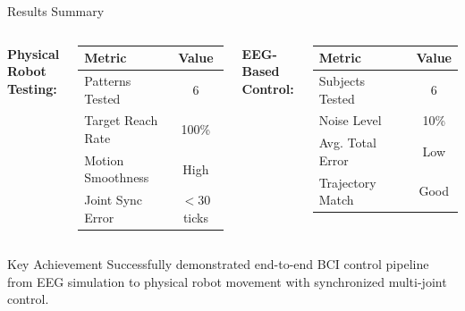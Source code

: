 \documentclass[aspectratio=169, 11pt]{beamer}
\begin{document}
\begin{frame}{Results Summary}
    \begin{columns}[T]
        \textbf{Physical Robot Testing:}
        \begin{table}
            \centering
            \small
            \begin{tabular}{lc}
                \toprule
                Metric & Value \\
                \midrule
                Patterns Tested & 6 \\
                Target Reach Rate & 100\% \\
                Motion Smoothness & High \\
                Joint Sync Error & $<$30 ticks \\
                \bottomrule
            \end{tabular}
        \end{table}
        
        \textbf{EEG-Based Control:}
        \begin{table}
            \centering
            \small
            \begin{tabular}{lc}
                \toprule
                Metric & Value \\
                \midrule
                Subjects Tested & 6 \\
                Noise Level & 10\% \\
                Avg. Total Error & Low \\
                Trajectory Match & Good \\
                \bottomrule
            \end{tabular}
        \end{table}
    \end{columns}
    
    \vspace{5mm}
    \begin{block}{Key Achievement}
        Successfully demonstrated end-to-end BCI control pipeline from EEG simulation to physical robot movement with synchronized multi-joint control.
    \end{block}
\end{frame}
\end{document}
